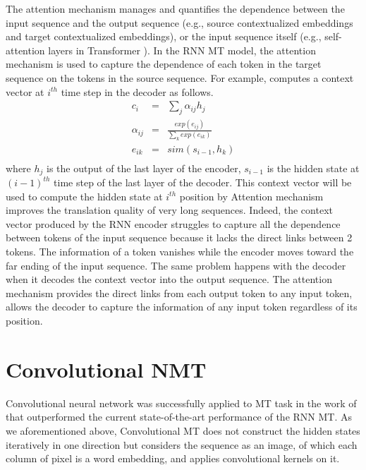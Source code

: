 The attention mechanism manages and quantifies the dependence between the input sequence and the output sequence (e.g., source contextualized embeddings and target contextualized embeddings), or the input sequence itself (e.g., self-attention layers in Transformer \citep{Vaswani17attention}). In the RNN MT model, the attention mechanism is used to capture the dependence of each token in the target sequence on the tokens in the source sequence. For example, \cite{Bahdanau15learning} computes a context vector at $i^{th}$ time step in the decoder as follows.
\begin{equation}
\begin{array}{rcl}
c_i &=& \sum_{j} \alpha_{ij} h_j \\
\alpha_{ij} &=& \frac{exp(e_{ij})}{\sum_{k}exp(e_{ik})} \\
e_{ik} &=& sim(s_{i-1},h_k)\\
\end{array}
\end{equation}
where $h_j$ is the output of the last layer of the encoder, $s_{i-1}$ is the hidden state at $(i-1)^{th}$ time step of the last layer of the  decoder. This context vector will be used to compute the hidden state at $i^{th}$ position by Attention mechanism improves the translation quality of very long sequences. Indeed, the context vector produced by the RNN encoder struggles to capture all the dependence between tokens  of the input sequence because it lacks the direct links between 2 tokens. The information of a token vanishes while the encoder moves toward the far ending of the input sequence. The same problem happens with the decoder when it decodes the context vector into the output sequence. The attention mechanism provides the direct links from each output token to any input token, allows the decoder to capture the information of any input token regardless of its position.

\section{Convolutional NMT} \label{sec:cnn}
Convolutional neural network was successfully applied to MT task in the work of \citet{Ghering17convolutional} that outperformed the current state-of-the-art performance of the RNN MT. As we aforementioned above, Convolutional MT does not construct the hidden states iteratively in one direction but considers the sequence as an image, of which each column of pixel is a word embedding, and applies convolutional kernels on it.
